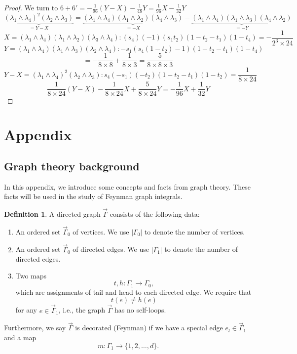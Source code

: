 \documentclass[11pt]{amsart}
\theoremstyle{definition}
\newtheorem{defn}[thm]{Definition}
\theoremstyle{remark}
\numberwithin{equation}{section}
\begin{document}
\begin{proof}
We turn to $\boxed{6}+\boxed{6'}=-\frac{1}{96}(Y-X)-\frac{1}{48}Y=\frac{1}{96}X-\frac{1}{32}Y$
$$
\underbrace{\left(\lambda_1 \wedge \lambda_4\right)^2\left(\lambda_2 \wedge \lambda_3\right)}_{=Y-X}=\underbrace{\left(\lambda_1 \wedge \lambda_4\right)\left(\lambda_1 \wedge \lambda_2\right)\left(\lambda_4 \wedge \lambda_3\right)}_{=-X}-\underbrace{\left(\lambda_1 \wedge \lambda_4\right)\left(\lambda_1 \wedge \lambda_3\right)\left(\lambda_4 \wedge \lambda_2\right)}_{=-Y}
$$
$$
X=\left(\lambda_1 \wedge \lambda_4\right)\left(\lambda_1 \wedge \lambda_2\right)\left(\lambda_3 \wedge \lambda_4\right):(s_4)(-1)(s_1t_2)(1-t_2-t_1)(1-t_4)=-\frac{1}{2^3\times 24}
$$
$$
Y=\left(\lambda_1 \wedge \lambda_4\right)\left(\lambda_1 \wedge \lambda_3\right)\left(\lambda_2 \wedge \lambda_4\right):-s_1(s_4(1-t_2)-1)(1-t_2-t_1)(1-t_4)
$$
$$
=-\frac{1}{8\times 8}+\frac{1}{8\times 3}=\frac{5}{8\times 8\times 3}
$$
$$
Y-X=\left(\lambda_1 \wedge \lambda_4\right)^2\left(\lambda_2 \wedge \lambda_3\right):s_4(-s_1)(-t_2)(1-t_2-t_1)(1-t_2)=\frac{1}{8\times 24}
$$
$$
\frac{1}{8\times 24}(Y-X)-\frac{1}{8\times 24}X+\frac{5}{8\times 24}Y=-\frac{1}{96}X+\frac{1}{32}Y
$$

\end{proof}
\fi
\section{Appendix}
\subsection{Graph theory background}\label{graph theory}

In this appendix, we introduce some concepts and facts from graph theory.
These facts will be used in the study of Feynman graph integrals.


\begin{defn}
    A directed graph $\vec{\Gamma}$ consists of the following data:
    \begin{enumerate}
        \item An ordered set $\vec{\Gamma}_{0}$ of vertices. We use $|\Gamma_{0}|$ to denote the number of vertices.
        \item An ordered set $\vec{\Gamma}_{0}$ of directed edges. We use $|\Gamma_{1}|$ to denote the number of directed edges.
        \item Two maps
        $$
        t,h:\Gamma_{1}\rightarrow\Gamma_{0},
        $$
        which are assignments of tail and head to each directed edge. We require that 
        $$
        t(e)\neq h(e)
        $$
        for any $e\in\vec{\Gamma}_{1}$, i.e., the graph $\vec{\Gamma}$ has no self-loops.
    \end{enumerate}
    Furthermore, we say $\vec{\Gamma}$ is decorated (Feynman) if we have a special edge $e_{l}\in \vec{\Gamma}_{1}$ and a map 
    $$
    m:\Gamma_{1}\rightarrow\{1,2,\dots,d\}.
    $$
\end{defn}
\end{document}
